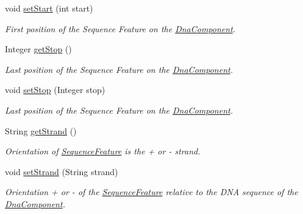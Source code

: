 \begin{DoxyCompactItemize}
void \hyperlink{classorg_1_1sbolstandard_1_1lib_s_b_o_lj_1_1_sequence_annotation_a95797ac4da76f48db6f9da6d5c1921cb}{setStart} (int start)
\begin{DoxyCompactList}\small\item\em First position of the Sequence Feature on the \hyperlink{classorg_1_1sbolstandard_1_1lib_s_b_o_lj_1_1_dna_component}{DnaComponent}. \item\end{DoxyCompactList}\item 
Integer \hyperlink{classorg_1_1sbolstandard_1_1lib_s_b_o_lj_1_1_sequence_annotation_ab7312487c80acd0453c38faaef61de8b}{getStop} ()
\begin{DoxyCompactList}\small\item\em Last position of the Sequence Feature on the \hyperlink{classorg_1_1sbolstandard_1_1lib_s_b_o_lj_1_1_dna_component}{DnaComponent}. \item\end{DoxyCompactList}\item 
void \hyperlink{classorg_1_1sbolstandard_1_1lib_s_b_o_lj_1_1_sequence_annotation_a6f27d883517282bf39452ee31373d266}{setStop} (Integer stop)
\begin{DoxyCompactList}\small\item\em Last position of the Sequence Feature on the \hyperlink{classorg_1_1sbolstandard_1_1lib_s_b_o_lj_1_1_dna_component}{DnaComponent}. \item\end{DoxyCompactList}\item 
String \hyperlink{classorg_1_1sbolstandard_1_1lib_s_b_o_lj_1_1_sequence_annotation_aab2543119d16ab85073c45c182a7d010}{getStrand} ()
\begin{DoxyCompactList}\small\item\em Orientation of \hyperlink{classorg_1_1sbolstandard_1_1lib_s_b_o_lj_1_1_sequence_feature}{SequenceFeature} is the + or -\/ strand. \item\end{DoxyCompactList}\item 
void \hyperlink{classorg_1_1sbolstandard_1_1lib_s_b_o_lj_1_1_sequence_annotation_a336a936a47073d186cafc97952c0c11a}{setStrand} (String strand)
\begin{DoxyCompactList}\small\item\em Orientation + or -\/ of the \hyperlink{classorg_1_1sbolstandard_1_1lib_s_b_o_lj_1_1_sequence_feature}{SequenceFeature} relative to the DNA sequence of the \hyperlink{classorg_1_1sbolstandard_1_1lib_s_b_o_lj_1_1_dna_component}{DnaComponent}. \item\end{DoxyCompactList}\item 

\end{DoxyCompactItemize}
